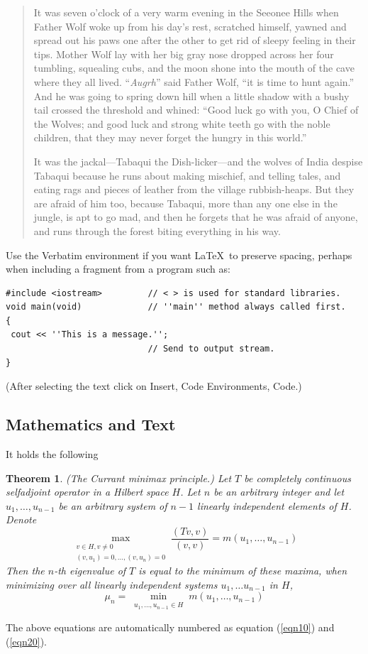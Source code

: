 \documentclass{article}%
\newtheorem{theorem}{Theorem}
\begin{document}
\begin{quotation}
It was seven o'clock of a very warm evening in the Seeonee Hills when Father Wolf woke
up from his day's rest, scratched himself, yawned  and spread out his paws one after
the other to get rid of sleepy feeling in their tips. Mother Wolf lay with her big gray
nose dropped across her four tumbling, squealing cubs, and the moon shone into the
mouth of the cave where they all lived. ``\emph{Augrh}'' said Father Wolf, ``it is time
to hunt again.'' And he was going to spring down hill when a little shadow with a bushy
tail crossed the threshold and whined: ``Good luck go with you, O Chief of the Wolves;
and good luck and strong white teeth go with the noble children, that they may never
forget the hungry in this world.''

It was the jackal---Tabaqui the Dish-licker---and the wolves of India despise Tabaqui
because he runs about making mischief, and telling tales, and eating rags and pieces of
leather from the village rubbish-heaps. But they are afraid of him too, because
Tabaqui, more than any one else in the jungle, is apt to go mad, and then he forgets
that he was afraid of anyone, and runs through the forest biting everything in his way.
\end{quotation}

Use the Verbatim environment if you want \LaTeX\ to preserve spacing, perhaps when
including a fragment from a program such as:
\begin{verbatim}
#include <iostream>         // < > is used for standard libraries.
void main(void)             // ''main'' method always called first.
{
 cout << ''This is a message.'';
                            // Send to output stream.
}
\end{verbatim}
(After selecting the text click on Insert, Code Environments, Code.)


\subsection{Mathematics and Text}

It holds \cite{KarelRektorys} the following
\begin{theorem}
(The Currant minimax principle.) Let $T$ be completely continuous selfadjoint operator
in a Hilbert space $H$. Let $n$ be an arbitrary integer and let $u_1,\ldots,u_{n-1}$ be
an arbitrary system of $n-1$ linearly independent elements of $H$. Denote
\begin{equation}
\max_{\substack{v\in H, v\neq
0\\(v,u_1)=0,\ldots,(v,u_n)=0}}\frac{(Tv,v)}{(v,v)}=m(u_1,\ldots, u_{n-1})
\label{eqn10}
\end{equation}
Then the $n$-th eigenvalue of $T$ is equal to the minimum of these maxima, when
minimizing over all linearly independent systems $u_1,\ldots u_{n-1}$ in $H$,
\begin{equation}
\mu_n = \min_{\substack{u_1,\ldots, u_{n-1}\in H}} m(u_1,\ldots, u_{n-1}) \label{eqn20}
\end{equation}
\end{theorem}
The above equations are automatically numbered as equation (\ref{eqn10}) and
(\ref{eqn20}).
\end{document}

